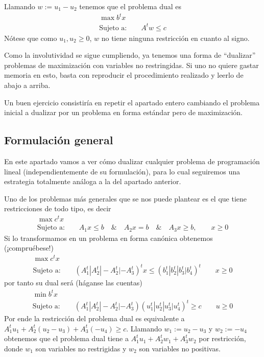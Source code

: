 Llamando $w:=u_1-u_2$ tenemos que el problema dual es
\begin{equation*}
\begin{array}{c}
\max b^tx\\
\text{Sujeto a:}\qquad A^tw\leq c
\end{array}
\end{equation*}
Nótese que como $u_1,u_2\geq 0$, $w$ no tiene ninguna restricción en cuanto al signo.

Como la involutividad se sigue cumpliendo, ya tenemos una forma de ``dualizar'' problemas de maximización con variables no restringidas. Si uno no quiere gastar memoria en esto, basta con reproducir el procedimiento realizado y leerlo de abajo a arriba.

Un buen ejercicio consistiría en repetir el apartado entero cambiando el problema inicial a dualizar por un problema en forma estándar pero de maximización.
\subsection{Formulación general}
En este apartado vamos a ver cómo dualizar cualquier problema de programación lineal (independientemente de su formulación), para lo cual seguiremos una estrategia totalmente análoga a la del apartado anterior.

Uno de los problemas más generales que se nos puede plantear es el que tiene restricciones de todo tipo, es decir
 \begin{equation*}
 \begin{array}{c}
 \max c^tx\\
 \text{Sujeto a:}\qquad A_1x\leq b\quad \&\quad A_2x=b\quad\&\quad A_3x\geq b,\qquad x\geq 0
 \end{array}
 \end{equation*}
 Si lo transformamos en un problema en forma canónica obtenemos (¡compruébese!)
 \begin{equation*}
 \begin{array}{c}
 \max c^tx\\
 \text{Sujeto a:}\qquad (A_1^t|A_2^t|-A_2^t|-A_3^t)^tx\leq (b_1^t|b_2^t|b_3^t|b_4^t)^t\qquad x\geq 0
 \end{array}
 \end{equation*}
 por tanto su dual será (háganse las cuentas)
  \begin{equation*}
  \begin{array}{c}
  \min b^tx\\
  \text{Sujeto a:}\qquad (A_1^t|A_2^t|-A_2^t|-A_3^t)(u_1^t|u_2^t|u_3^t|u_4^t)^t\geq c\qquad u\geq 0
  \end{array}
  \end{equation*}
  Por ende la restricción del problema dual es equivalente a $A_1^tu_1+A_2^t(u_2-u_3)+A_3^t(-u_4)\geq c$. Llamando $w_1:=u_2-u_3$ y $w_2:=-u_4$ obtenemos que el problema dual tiene a $A_1^tu_1+A_2^tw_1+A_3^tw_2$ por restricción, donde $w_1$ son variables no restrigidas y $w_2$ son variables no positivas.
  
